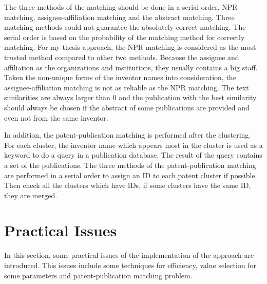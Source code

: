 The three methods of the matching should be done in a serial order, NPR matching, assignee-affiliation matching and the abstract matching. Three matching methods could not guarantee the absolutely correct matching. The serial order is based on the probability of the matching method for correctly matching. For my thesis approach, the NPR matching is considered as the most trusted method compared to other two methods. Because the assignee and affiliation as the organizations and institutions, they usually contains a big staff. Taken the non-unique forms of the inventor names into consideration,  the assignee-affiliation matching is not as reliable as the NPR matching. The text similarities are always larger than 0 and the publication with the best similarity should always be chosen if the abstract of some publications are provided and even not from the same inventor. 

In addition, the patent-publication matching is performed after the clustering. For each cluster, the inventor name which appears most in the cluster is used as a keyword to do a query in a publication database. The result of the query contains a set of the publications. The three methods of the patent-publication matching are performed in a serial order to assign an ID to each patent cluster if possible. Then check all the clusters which have IDs, if some clusters have the same ID, they are merged.

\section{Practical Issues}
In this section, some practical issues of the implementation of the approach are introduced. This issues include some techniques for efficiency, value selection for some parameters and patent-publication matching problem.

